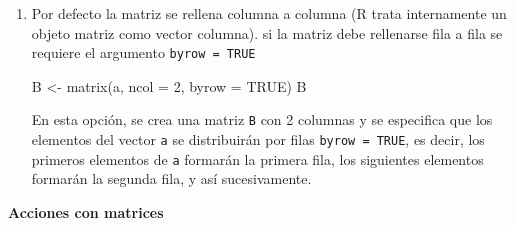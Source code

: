 \documentclass[
  jou,
  floatsintext,
  longtable,
  a4paper,
  nolmodern,
  notxfonts,
  notimes,
  12pt,
  colorlinks=true,linkcolor=blue,citecolor=blue,urlcolor=blue]{apa7}
\newenvironment{Shaded}{\begin{snugshade}}{\end{snugshade}}
\newcommand{\AttributeTok}[1]{\textcolor[rgb]{0.40,0.45,0.13}{#1}}
\newcommand{\ConstantTok}[1]{\textcolor[rgb]{0.56,0.35,0.01}{#1}}
\newcommand{\DecValTok}[1]{\textcolor[rgb]{0.68,0.00,0.00}{#1}}
\newcommand{\FunctionTok}[1]{\textcolor[rgb]{0.28,0.35,0.67}{#1}}
\newcommand{\NormalTok}[1]{\textcolor[rgb]{0.00,0.23,0.31}{#1}}
\newcommand{\OtherTok}[1]{\textcolor[rgb]{0.00,0.23,0.31}{#1}}
\begin{document}
\begin{enumerate}
\begin{Shaded}
\begin{Highlighting}[]
\NormalTok{A }\OtherTok{\textless{}{-}} \FunctionTok{matrix}\NormalTok{(a, }\AttributeTok{ncol =} \DecValTok{2}\NormalTok{)}
\NormalTok{A}
\end{Highlighting}
\end{Shaded}

  En esta variante, se crea una matriz \texttt{A} con 2 columnas y se
  ajusta automáticamente el número de filas según la longitud del vector
  \texttt{a}.
\item
  Por defecto la matriz se rellena columna a columna (R trata
  internamente un objeto matriz como vector columna). si la matriz debe
  rellenarse fila a fila se requiere el argumento
  \texttt{byrow\ =\ TRUE}

\begin{Shaded}
\begin{Highlighting}[]
\NormalTok{B }\OtherTok{\textless{}{-}} \FunctionTok{matrix}\NormalTok{(a, }\AttributeTok{ncol =} \DecValTok{2}\NormalTok{, }\AttributeTok{byrow =} \ConstantTok{TRUE}\NormalTok{)}
\NormalTok{B}
\end{Highlighting}
\end{Shaded}

  En esta opción, se crea una matriz \texttt{B} con 2 columnas y se
  especifica que los elementos del vector \texttt{a} se distribuirán por
  filas \texttt{byrow\ =\ TRUE}, es decir, los primeros elementos de
  \texttt{a} formarán la primera fila, los siguientes elementos formarán
  la segunda fila, y así sucesivamente.
\end{enumerate}

\textbf{Acciones con matrices}
\end{document}
